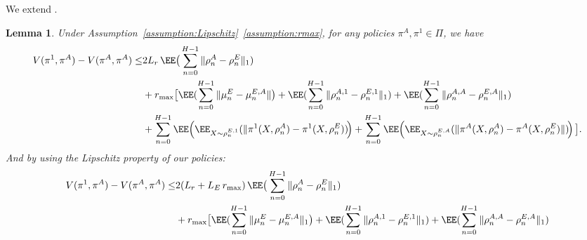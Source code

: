 \documentclass{article}
\theoremstyle{plain}
\newtheorem{lemma}[theorem]{Lemma}
\begin{document}
We extend \citep[Lemma 1 C.1]{ramponi2023imitation}. 
\begin{lemma}
    \label{lemma:Vpi1piA-VpiApiA}
    Under Assumption~\eqref{assumption:Lipschitz}~\eqref{assumption:rmax}, for any policies $\pi^A, \pi^1 \in \Pi$, we have 
    \begin{equation}
    \label{eq:Vpi1piA-VpiApiA}
    \begin{split}
        V(\pi^1, \pi^A) - V(\pi^A, \pi^A)\leq&  2 L_r \, \EE\big(\sum_{n = 0}^{H-1} \|\rho^A_n - \rho^E_n\|_1) \\
        &
        +r_{\max} \big[\EE( \sum_{n=0}^{H-1} \| \mu^{E}_n - \mu^{E,A}_n\|\big)  + \EE (\sum_{n= 0}^{H-1} \| \rho^{A,1}_n - \rho^{E,1}_n\|_1) +  \EE (\sum_{n= 0}^{H-1} \| \rho^{A, A}_n - \rho^{E, A}_n\|_1) \\
        &+ \sum_{n= 0}^{H-1}\EE \!\left(\EE_{X \sim \rho^{E, 1}_n}(\|\pi^1(X, \rho^A_n) - \pi^1(X, \rho^E_n))\!\right)   
        + \sum_{n= 0}^{H-1}\EE \!\left(\EE_{X \sim \rho^{E, A}_n}(\|\pi^A(X, \rho^A_n) - \pi^A(X, \rho^E_n)\|)\!\right)\big].
    \end{split}
    \end{equation}
    And by using the Lipschitz property of our policies:
    \begin{equation}
        \label{eq:Vpi1piA-VpiApiA-Lipschitz}
         \begin{split}
            V(\pi^1, \pi^A) - V(\pi^A, \pi^A)\leq&  2 (L_r + L_E \,r_{\max}) \, \EE\big(\sum_{n = 0}^{H-1} \|\rho^A_n - \rho^E_n\|_1) \\
            &
            +r_{\max} \big[\EE( \sum_{n=0}^{H-1} \| \mu^{E}_n - \mu^{E,A}_n\|_1\big)  + \EE (\sum_{n= 0}^{H-1} \| \rho^{A,1}_n - \rho^{E,1}_n\|_1) +  \EE (\sum_{n= 0}^{H-1} \| \rho^{A, A}_n - \rho^{E, A}_n\|_1)
         \end{split}
    \end{equation}
\end{lemma}
\end{document}
